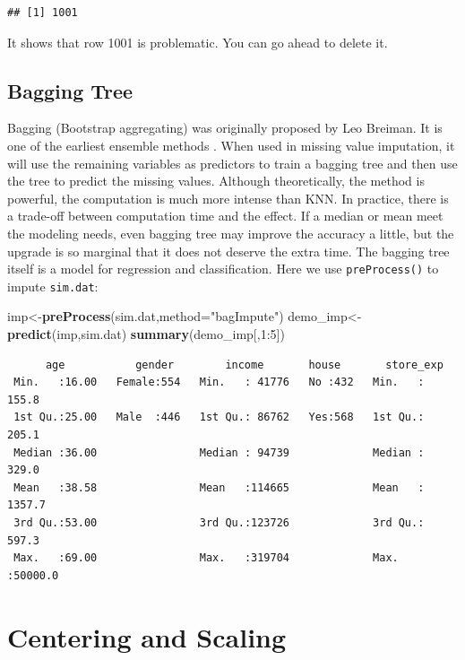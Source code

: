 \documentclass[12pt,]{krantz}
\newenvironment{Shaded}{\begin{snugshade}}{\end{snugshade}}
\newcommand{\KeywordTok}[1]{\textcolor[rgb]{0.13,0.29,0.53}{\textbf{{#1}}}}
\newcommand{\DataTypeTok}[1]{\textcolor[rgb]{0.13,0.29,0.53}{{#1}}}
\newcommand{\DecValTok}[1]{\textcolor[rgb]{0.00,0.00,0.81}{{#1}}}
\newcommand{\StringTok}[1]{\textcolor[rgb]{0.31,0.60,0.02}{{#1}}}
\newcommand{\NormalTok}[1]{{#1}}
\theoremstyle{definition}
\theoremstyle{definition}
\theoremstyle{remark}
\begin{document}
\begin{verbatim}
## [1] 1001
\end{verbatim}

It shows that row 1001 is problematic. You can go ahead to delete it.

\subsection{Bagging Tree}\label{bagging-tree}

Bagging (Bootstrap aggregating) was originally proposed by Leo Breiman.
It is one of the earliest ensemble methods \citep{bag1}. When used in
missing value imputation, it will use the remaining variables as
predictors to train a bagging tree and then use the tree to predict the
missing values. Although theoretically, the method is powerful, the
computation is much more intense than KNN. In practice, there is a
trade-off between computation time and the effect. If a median or mean
meet the modeling needs, even bagging tree may improve the accuracy a
little, but the upgrade is so marginal that it does not deserve the
extra time. The bagging tree itself is a model for regression and
classification. Here we use \texttt{preProcess()} to impute
\texttt{sim.dat}:

\begin{Shaded}
\begin{Highlighting}[]
\NormalTok{imp<-}\KeywordTok{preProcess}\NormalTok{(sim.dat,}\DataTypeTok{method=}\StringTok{"bagImpute"}\NormalTok{)}
\NormalTok{demo_imp<-}\KeywordTok{predict}\NormalTok{(imp,sim.dat)}
\KeywordTok{summary}\NormalTok{(demo_imp[,}\DecValTok{1}\NormalTok{:}\DecValTok{5}\NormalTok{])}
\end{Highlighting}
\end{Shaded}

\begin{verbatim}
      age           gender        income       house       store_exp      
 Min.   :16.00   Female:554   Min.   : 41776   No :432   Min.   :  155.8  
 1st Qu.:25.00   Male  :446   1st Qu.: 86762   Yes:568   1st Qu.:  205.1  
 Median :36.00                Median : 94739             Median :  329.0  
 Mean   :38.58                Mean   :114665             Mean   : 1357.7  
 3rd Qu.:53.00                3rd Qu.:123726             3rd Qu.:  597.3  
 Max.   :69.00                Max.   :319704             Max.   :50000.0  
\end{verbatim}

\section{Centering and Scaling}\label{centering-and-scaling}
\end{document}
